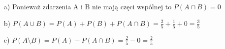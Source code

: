\medskip
{} 
\medskip

\begin{itemize}
\item[a)] Ponieważ zdarzenia A i B nie mają częci wspólnej to $P(A \cap B)=0 $
\item[b)] $P(A \cup B) = P(A) + P(B) + P(A \cap B) = \frac{2}{5} + \frac{1}{5}+0 = \frac{3}{5} $
\item[c)] $P(A \setminus B) = P(A) - P(A \cap B) = \frac{2}{5} - 0 = \frac{2}{5} 
$
\end{itemize}
